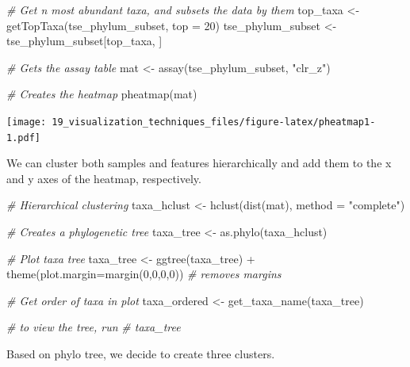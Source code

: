 \documentclass[
]{book}
\newenvironment{Shaded}{\begin{snugshade}}{\end{snugshade}}
\newcommand{\AttributeTok}[1]{\textcolor[rgb]{0.77,0.63,0.00}{#1}}
\newcommand{\CommentTok}[1]{\textcolor[rgb]{0.56,0.35,0.01}{\textit{#1}}}
\newcommand{\DecValTok}[1]{\textcolor[rgb]{0.00,0.00,0.81}{#1}}
\newcommand{\FunctionTok}[1]{\textcolor[rgb]{0.00,0.00,0.00}{#1}}
\newcommand{\NormalTok}[1]{#1}
\newcommand{\OtherTok}[1]{\textcolor[rgb]{0.56,0.35,0.01}{#1}}
\newcommand{\SpecialCharTok}[1]{\textcolor[rgb]{0.00,0.00,0.00}{#1}}
\newcommand{\StringTok}[1]{\textcolor[rgb]{0.31,0.60,0.02}{#1}}
\begin{document}
\begin{Shaded}
\begin{Highlighting}[]
\CommentTok{\# Get n most abundant taxa, and subsets the data by them}
\NormalTok{top\_taxa }\OtherTok{\textless{}{-}} \FunctionTok{getTopTaxa}\NormalTok{(tse\_phylum\_subset, }\AttributeTok{top =} \DecValTok{20}\NormalTok{)}
\NormalTok{tse\_phylum\_subset }\OtherTok{\textless{}{-}}\NormalTok{ tse\_phylum\_subset[top\_taxa, ]}

\CommentTok{\# Gets the assay table}
\NormalTok{mat }\OtherTok{\textless{}{-}} \FunctionTok{assay}\NormalTok{(tse\_phylum\_subset, }\StringTok{"clr\_z"}\NormalTok{)}

\CommentTok{\# Creates the heatmap}
\FunctionTok{pheatmap}\NormalTok{(mat)}
\end{Highlighting}
\end{Shaded}

\texttt{[image: 19\_visualization\_techniques\_files/figure-latex/pheatmap1-1.pdf]}

We can cluster both samples and features hierarchically and add them to the
x and y axes of the heatmap, respectively.

\begin{Shaded}
\begin{Highlighting}[]
\CommentTok{\# Hierarchical clustering}
\NormalTok{taxa\_hclust }\OtherTok{\textless{}{-}} \FunctionTok{hclust}\NormalTok{(}\FunctionTok{dist}\NormalTok{(mat), }\AttributeTok{method =} \StringTok{"complete"}\NormalTok{)}

\CommentTok{\# Creates a phylogenetic tree}
\NormalTok{taxa\_tree }\OtherTok{\textless{}{-}} \FunctionTok{as.phylo}\NormalTok{(taxa\_hclust)}

\CommentTok{\# Plot taxa tree}
\NormalTok{taxa\_tree }\OtherTok{\textless{}{-}} \FunctionTok{ggtree}\NormalTok{(taxa\_tree) }\SpecialCharTok{+} 
  \FunctionTok{theme}\NormalTok{(}\AttributeTok{plot.margin=}\FunctionTok{margin}\NormalTok{(}\DecValTok{0}\NormalTok{,}\DecValTok{0}\NormalTok{,}\DecValTok{0}\NormalTok{,}\DecValTok{0}\NormalTok{)) }\CommentTok{\# removes margins}

\CommentTok{\# Get order of taxa in plot}
\NormalTok{taxa\_ordered }\OtherTok{\textless{}{-}} \FunctionTok{get\_taxa\_name}\NormalTok{(taxa\_tree)}

\CommentTok{\# to view the tree, run}
\CommentTok{\# taxa\_tree}
\end{Highlighting}
\end{Shaded}

Based on phylo tree, we decide to create three clusters.
\end{document}
